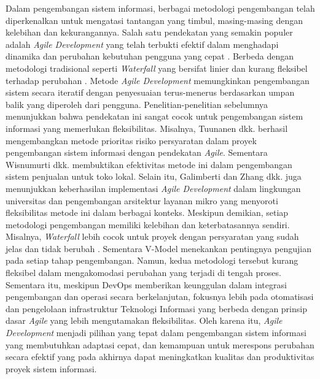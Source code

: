 Dalam pengembangan sistem informasi, berbagai metodologi pengembangan telah diperkenalkan untuk mengatasi tantangan yang timbul, masing-masing dengan kelebihan dan kekurangannya. Salah satu pendekatan yang semakin populer adalah \textit{Agile Development} yang telah terbukti efektif dalam menghadapi dinamika dan perubahan kebutuhan pengguna yang cepat \cite{al2020agile}. Berbeda dengan metodologi tradisional seperti \textit{Waterfall} yang bersifat linier dan kurang fleksibel terhadap perubahan \cite{firdaus2020rancang}. Metode \textit{Agile Development} memungkinkan pengembangan sistem secara iteratif dengan penyesuaian terus-menerus berdasarkan umpan balik yang diperoleh dari pengguna. Penelitian-penelitian sebelumnya menunjukkan bahwa pendekatan ini sangat cocok untuk pengembangan sistem informasi yang memerlukan fleksibilitas. Misalnya, Tuunanen dkk. \citeyear{tuunanen2023development} berhasil mengembangkan metode prioritas risiko persyaratan dalam proyek pengembangan sistem informasi dengan pendekatan \textit{Agile}. Sementara Wisnumurti dkk. \citeyear{wisnumurti2022penerapan} membuktikan efektivitas metode ini dalam pengembangan sistem penjualan untuk toko lokal. Selain itu, Galimberti \citeyear{trelles2021agile} dan Zhang dkk. \citeyear{zhang2024establishment} juga menunjukkan keberhasilan implementasi \textit{Agile Development} dalam lingkungan universitas dan pengembangan arsitektur layanan mikro yang menyoroti fleksibilitas metode ini dalam berbagai konteks. Meskipun demikian, setiap metodologi pengembangan memiliki kelebihan dan keterbatasannya sendiri. Misalnya, \textit{Waterfall} lebih cocok untuk proyek dengan persyaratan yang sudah jelas dan tidak berubah \cite{al2020agile}. Sementara V-Model menekankan pentingnya pengujian pada setiap tahap pengembangan. Namun, kedua metodologi tersebut kurang fleksibel dalam mengakomodasi perubahan yang terjadi di tengah proses. Sementara itu, meskipun DevOps memberikan keunggulan dalam integrasi pengembangan dan operasi secara berkelanjutan, fokusnya lebih pada otomatisasi dan pengelolaan infrastruktur Teknologi Informasi yang berbeda dengan prinsip dasar \textit{Agile} yang lebih mengutamakan fleksibilitas. Oleh karena itu, \textit{Agile Development} menjadi pilihan yang tepat dalam pengembangan sistem informasi yang membutuhkan adaptasi cepat, dan kemampuan untuk merespons perubahan secara efektif yang pada akhirnya dapat meningkatkan kualitas dan produktivitas proyek sistem informasi.

